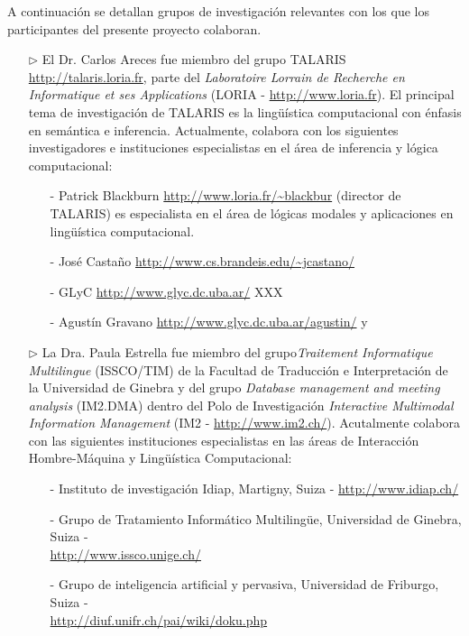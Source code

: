 A continuaci\'on se detallan grupos de investigaci\'on relevantes con los que los  participantes del presente proyecto colaboran.


\begin{itemize}
    \item[$\triangleright$] El Dr. Carlos Areces fue miembro
del grupo TALARIS \url{http://talaris.loria.fr}, parte del
\textit{Laboratoire Lorrain de Recherche en Informatique et ses Applications} (LORIA - \url{http://www.loria.fr}). El principal tema de investigaci\'on de TALARIS es la ling\"u\'istica computacional con \'enfasis en sem\'antica e inferencia. Actualmente, colabora con los siguientes investigadores e instituciones especialistas en el \'area de inferencia y l\'ogica computacional:
\begin{itemize}
    \item[-]  Patrick Blackburn \url{http://www.loria.fr/~blackbur} (director de TALARIS) es especialista en el \'area de l\'ogicas modales y aplicaciones
en ling\"u\'istica computacional.
\item[-] Jos\'e Casta\~no \url{http://www.cs.brandeis.edu/~jcastano/}
\item[-]  GLyC \url{http://www.glyc.dc.uba.ar/} XXX
\item[-] Agust\'in Gravano \url{http://www.glyc.dc.uba.ar/agustin/} y 
\end{itemize}
 \item[$\triangleright$] La Dra. Paula Estrella fue miembro del grupo\textit{Traitement Informatique Multilingue} (ISSCO/TIM) de la Facultad de Traducci\'on e Interpretaci\'on de la Universidad de Ginebra y del grupo \textit{Database management and meeting analysis} (IM2.DMA) dentro del Polo de Investigaci\'on \textit{Interactive Multimodal Information Management} (IM2 - \url{http://www.im2.ch/}). Acutalmente colabora con las siguientes instituciones especialistas en las \'areas de Interacci\'on Hombre-M\'aquina y  Ling\"u\'istica Computacional:
\begin{itemize}
    \item[-]  Instituto de investigaci\'on Idiap, Martigny, Suiza -  \url{http://www.idiap.ch/}
\item[-] Grupo de Tratamiento Inform\'atico Multiling\"ue, Universidad de Ginebra, Suiza - \\ \url{http://www.issco.unige.ch/}
\item[-]  Grupo de inteligencia artificial y pervasiva, Universidad de Friburgo, Suiza - \\ \url{http://diuf.unifr.ch/pai/wiki/doku.php}

\end{itemize}
\end{itemize}
